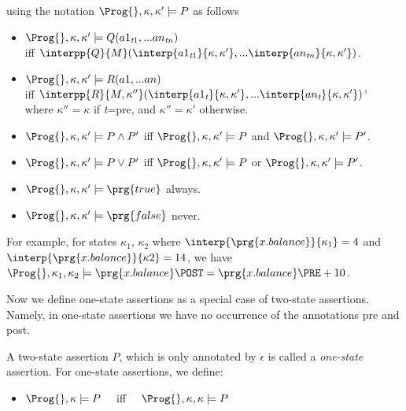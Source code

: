 {\begin{definition}
\noindent
using the notation $\Prog{},\kappa,\kappa'\models P $ as follows
\begin{itemize}
\item
 $\Prog{},\kappa,\kappa'\models Q(a1_{{\textit{t}1}},...an_{{\textit{t}n}}) $ \\
 iff   $\interpp{Q}{M}(\interp{a1_{{\textit{t}1}}}{\kappa,\kappa'}, ...\interp{an_{{\textit{t}n}}}{\kappa,\kappa'})$.
 \item
  $\Prog{},\kappa,\kappa'\models R(a1,...an) $ \\
  iff   $\interpp{R}{M,\kappa''}(\interp{a1_{{\textit{t}}}}{\kappa,\kappa'}, ...\interp{an_{{\textit{t}}}}{\kappa,\kappa'})$'\\
   where $\kappa''=\kappa$ if  {{\textit{t}}}=\textsf{pre}, and  $\kappa''=\kappa'$ otherwise.
    \item $\Prog{},\kappa,\kappa'\models P \wedge P' $  iff $\Prog{},\kappa,\kappa'\models P  $
    and    $\Prog{},\kappa,\kappa'\models P' $.
     \item $\Prog{},\kappa,\kappa'\models P \vee P' $  iff $\Prog{},\kappa,\kappa'\models P  $
    or    $\Prog{},\kappa,\kappa'\models P' $.
     \item $\Prog{},\kappa,\kappa'\models \prg{true} $  always.
     \item $\Prog{},\kappa,\kappa'\models \prg{false} $ never.
    \end{itemize}

\end{definition}

\noindent
  For example, for states $\kappa_1$, $\kappa_2$ where 
$\interp  {\prg{x.balance}} {\kappa_1}  = 4$  and $\interp
{\prg{x.balance}} {\kappa2}  = 14$,  
we have\\
\noindent  $\Prog{},\kappa_1,\kappa_2\models \prg{x.balance}\POST = \prg{x.balance}\PRE+10$.


Now we define one-state assertions as a special case of two-state assertions. Namely, in one-state assertions we have no occurrence of the annotations \textsf{pre} and \textsf{post}.

\begin{definition} $ ~ $ \\
\label{def:one-state-assertions}
A two-state assertion $P$, which is only annotated by $\epsilon$ is called a {\em one-state} assertion.
For one-state assertions, we define: %
\begin{itemize}
\item
 $\Prog{},\kappa \models P $ \ \ 
 iff  \ \   $\Prog{},\kappa, \kappa \models P $
    \end{itemize}


\end{definition}}
